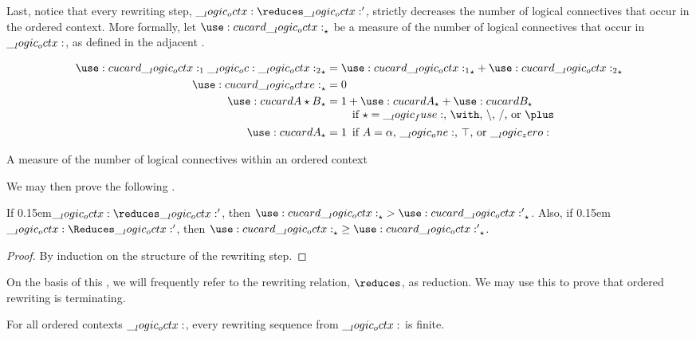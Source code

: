 Last, notice that every rewriting step, $\octx \reduces \octx'$, strictly decreases the number of logical connectives that occur in the ordered context.
More formally, let $\card{\octx}_{\star}$ be a measure of the number of logical connectives that occur in $\__logic_octx:$, as defined in the adjacent .
%
\begin{marginfigure}
  \begin{align*}
    \card{\octx_1 \oc \octx_2}_{\star} &= \card{\octx_1}_{\star} + \card{\octx_2}_{\star} \\
    \card{\octxe}_{\star} &= 0 \\
    \card{A \star B}_{\star} &= \begin{tabular}[t]{@{}l@{}}
                          $1 + \card{A}_{\star} + \card{B}_{\star}$ \\
                          \quad if $\mathord{\star} = \mathord{\fuse}$, $\mathord{\with}$, $\mathord{\limp}$, $\mathord{\pmir}$, or $\mathord{\plus}$
                         \end{tabular} \\
    \card{A}_{\star} &= \mathrlap{1}
                    \quad \text{if $A = \alpha$, $\one$, $\top$, or $\zero$}
  \end{align*}
  \caption{A measure of the number of logical connectives within an ordered context}\label{fig:ordered-rewriting:measure}
\end{marginfigure}%
%
We may then prove the following .%
%
\begin{lemma}\label{lem:ordered-rewriting:reduction}
  If \kern0.15em$\octx \reduces \octx'$, then $\card{\octx}_{\star} > \card{\octx'}_{\star}$.
  Also, if \kern0.15em$\octx \Reduces \octx'$, then $\card{\octx}_{\star} \geq \card{\octx'}_{\star}$.
\end{lemma}
%
\begin{proof}
  By induction on the structure of the rewriting step.
\end{proof}
%
\noindent
On the basis of this , we will frequently refer to the rewriting relation, $\reduces$, as reduction.
We may use this  to prove that ordered rewriting is terminating.
% 
%
\begin{theorem}[Termination]
  For all ordered contexts $\__logic_octx:$, every rewriting sequence from $\__logic_octx:$ is finite.
\end{theorem}
